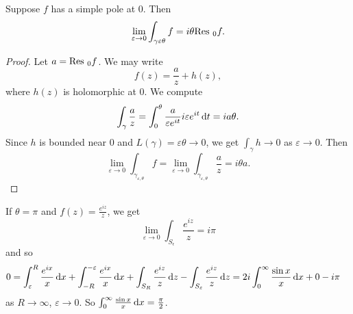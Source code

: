 \begin{xmpl}
\begin{enumerate}
{      \begin{lemma}
        Suppose $f$ has a simple pole at 0. Then
        $$
          \lim_{\varepsilon \to 0}
            \int_{\gamma \varepsilon \theta} f
        = i \theta
          \mathrm{Res}~_0 f.
        $$
      \end{lemma}
      \begin{proof}
        Let $a = \mathrm{Res}~_0 f$. We may write
        $$
        f(z) = \frac{a}{z} + h(z),
        $$
        where $h(z)$ is holomorphic at 0. We compute
        $$
          \int_\gamma
            \frac{a}{z}
        = \int_0^\theta
            \frac{a}{\varepsilon e^{it}}
            i \varepsilon e^{it}
            \mathop{}\!\mathrm{d} t
        = i a \theta.
        $$
        Since $h$ is bounded near 0 and
        $L(\gamma) = \varepsilon \theta \to 0$,
        we get $\int_\gamma h \to 0$ as $\varepsilon \to 0$.
        Then
        $$
          \lim_{\varepsilon \to 0}
            \int_{\gamma_{\varepsilon, \theta}} f
        = \lim_{\varepsilon \to 0}
            \int_{\gamma_{\varepsilon, \theta}}
            \frac{a}{z}
        = i \theta a.
        $$
      \end{proof}
      If $\theta = \pi$ and $f(z) = \frac{e^{i z}}{z}$, we get
      $$
        \lim_{\varepsilon \to 0}
          \int_{S_\epsilon}
            \frac{e^{iz}}{z}
      = i \pi
      $$
      and so
      \begin{align*}
         0
      &= \int_\varepsilon^R
           \frac{e^{ix}}{x}
           \mathop{}\!\mathrm{d} x
       + \int_{-R}^{-\varepsilon}
           \frac{e^{ix}}{x}
           \mathop{}\!\mathrm{d} x
       + \int_{S_R}
           \frac{e^{iz}}{z}
           \mathop{}\!\mathrm{d} z
       - \int_{S_\varepsilon}
           \frac{e^{iz}}{z}
           \mathop{}\!\mathrm{d} z
       = 2 i
         \int_0^\infty
           \frac{\sin x}{x}
           \mathop{}\!\mathrm{d} x
       + 0
       - i \pi
      \end{align*}
      as $R \to \infty$, $\varepsilon \to 0$. So
      $\int_0^\infty \frac{\sin x}{x} \mathop{}\!\mathrm{d} x = \frac{\pi}{2}$.
    }
\end{enumerate}
\end{xmpl}

